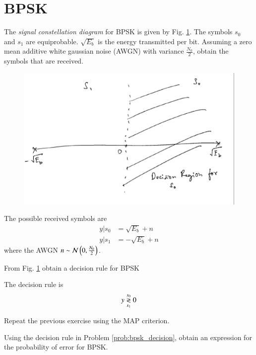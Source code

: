 \documentclass[journal,12pt,twocolumn]{IEEEtran}
\begin{document}
\section{BPSK}
\begin{problem}
The {\em signal constellation diagram} for BPSK is given by Fig. \ref{fig:bpsk_const}.  The symbols $s_0$ and $s_1$ are equiprobable.  $\sqrt{E_b}$ is the energy transmitted per bit. Assuming a zero mean additive white gaussian noise (AWGN) with variance $\frac{N_0}{2}$,
obtain the symbols that are received.
\end{problem}
%
\begin{figure}[!h]
\centering
\includegraphics[width=\columnwidth]{./figs/bpsk_const.eps}
\caption{}
\label{fig:bpsk_const}
\end{figure}
\solution The possible received symbols are
\begin{align}
y|s_0 &= \sqrt{E_b} + n
\\
y|s_1 &= -\sqrt{E_b} + n
\end{align}
%
where the AWGN $n \sim \mathcal{N}\left(0,\frac{N_0}{2}\right)$.
%
\begin{problem}
\label{prob:bpsk_decision}
From Fig. \ref{fig:bpsk_const} obtain a decision rule for BPSK
\end{problem}
\solution The decision rule is
\begin{equation}
y \overset{s_0}{\underset{s_1}{\gtrless}} 0
\end{equation}
\begin{problem}
Repeat the previous exercise using the MAP criterion.
\end{problem}
\begin{problem}
Using the decision rule in Problem \ref{prob:bpsk_decision}, obtain an expression for the probability of error for BPSK.
\end{problem}
\end{document}
